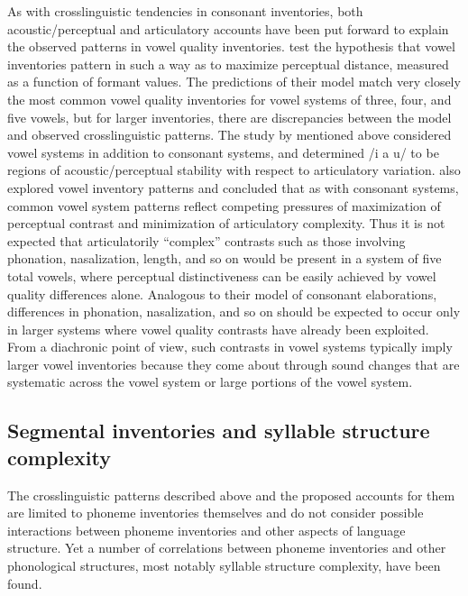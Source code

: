   As with crosslinguistic tendencies in consonant inventories, both acoustic/perceptual and articulatory accounts have been put forward to explain the observed patterns in vowel quality inventories. \citet{LiljencrantsLindblom1972} test the hypothesis that vowel inventories pattern in such a way as to maximize perceptual distance, measured as a function of formant values. The predictions of their model match very closely the most common vowel quality inventories for vowel systems of three, four, and five vowels, but for larger inventories, there are discrepancies between the model and observed crosslinguistic patterns. The study by \citet{Stevens1989} mentioned above considered vowel systems in addition to consonant systems, and determined /i a u/ to be regions of acoustic/perceptual stability with respect to articulatory variation. \citet{LindblomMaddieson1988} also explored vowel inventory patterns and concluded that as with consonant systems, common vowel system patterns reflect competing pressures of maximization of perceptual contrast and minimization of articulatory complexity. Thus it is not expected that articulatorily ``complex'' contrasts such as those involving phonation, nasalization, length, and so on would be present in a system of five total vowels, where perceptual distinctiveness can be easily achieved by vowel quality differences alone. Analogous to their model of consonant elaborations, differences in phonation, nasalization, and so on should be expected to occur only in larger systems where vowel quality contrasts have already been exploited. From a diachronic point of view, such contrasts in vowel systems typically imply larger vowel inventories because they come about through sound changes that are systematic across the vowel system or large portions of the vowel system.

\subsection{Segmental inventories and syllable structure complexity}\label{sec:4.1.3}

  The crosslinguistic patterns described above and the proposed accounts for them are limited to phoneme inventories themselves and do not consider possible interactions between phoneme inventories and other aspects of language structure. Yet a number of correlations between phoneme inventories and other phonological structures, most notably syllable structure complexity, have been found.

